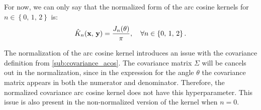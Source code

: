 For now, we can only say that the normalized form of the arc cosine kernels
for $n \in \left\{ 0,\,1,\,2 \right\}$ is:
\begin{equation}
    \hat{K}_n(\mathbf{x},\,\mathbf{y}) = \frac{J_n(\theta)}{\pi}, \quad \forall n \in \left\{ 0,\,1,\,2 \right\}.
\end{equation}


The normalization of the arc cosine kernel introduces an issue with the
covariance definition from \cref{sub:covariance_acos}. The covariance matrix
$\Sigma$ will be cancels out in the normalization, since in the expression
for the angle $\theta$ the covariance matrix appears in both the numerator and
denominator. Therefore, the normalized covariance arc cosine kernel does
not have this hyperparameter. This issue is also present in the non-normalized
version of the kernel when $n = 0$.
